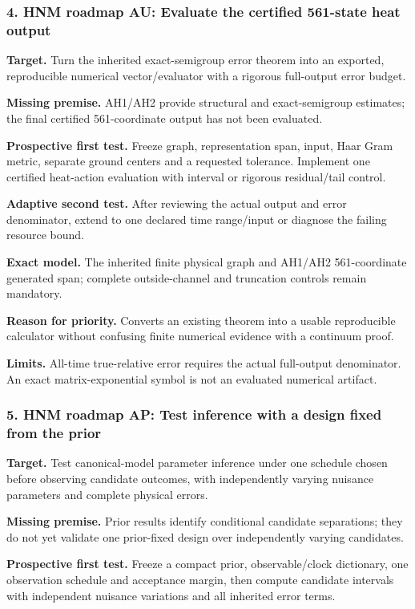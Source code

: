 \subsubsection{4. HNM roadmap AU: Evaluate the certified 561-state heat output}
\textbf{Target.} Turn the inherited exact-semigroup error theorem into an exported, reproducible numerical vector/evaluator with a rigorous full-output error budget.

\textbf{Missing premise.} AH1/AH2 provide structural and exact-semigroup estimates; the final certified 561-coordinate output has not been evaluated.

\textbf{Prospective first test.} Freeze graph, representation span, input, Haar Gram metric, separate ground centers and a requested tolerance. Implement one certified heat-action evaluation with interval or rigorous residual/tail control.

\textbf{Adaptive second test.} After reviewing the actual output and error denominator, extend to one declared time range/input or diagnose the failing resource bound.

\textbf{Exact model.} The inherited finite physical graph and AH1/AH2 561-coordinate generated span; complete outside-channel and truncation controls remain mandatory.

\textbf{Reason for priority.} Converts an existing theorem into a usable reproducible calculator without confusing finite numerical evidence with a continuum proof.

\textbf{Limits.} All-time true-relative error requires the actual full-output denominator. An exact matrix-exponential symbol is not an evaluated numerical artifact.

\subsubsection{5. HNM roadmap AP: Test inference with a design fixed from the prior}
\textbf{Target.} Test canonical-model parameter inference under one schedule chosen before observing candidate outcomes, with independently varying nuisance parameters and complete physical errors.

\textbf{Missing premise.} Prior results identify conditional candidate separations; they do not yet validate one prior-fixed design over independently varying candidates.

\textbf{Prospective first test.} Freeze a compact prior, observable/clock dictionary, one observation schedule and acceptance margin, then compute candidate intervals with independent nuisance variations and all inherited error terms.

